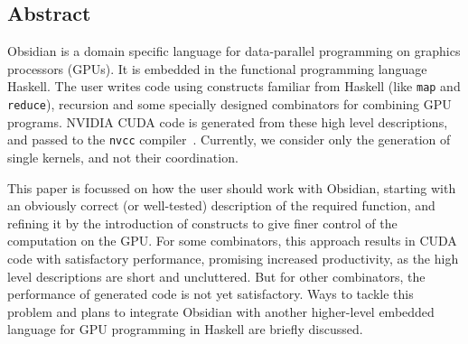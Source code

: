 





\subsection*{Abstract}
Obsidian is a domain specific language for data-parallel programming 
on graphics processors (GPUs). It is embedded in the functional 
programming language Haskell. The user writes code using constructs 
familiar from Haskell (like {\tt map} and {\tt reduce}), recursion 
and some specially designed combinators for combining GPU programs. 
NVIDIA CUDA code is generated from these high level descriptions, and 
passed to the {\tt nvcc} compiler~\cite{CUDAGuide2.0}. Currently, we 
consider only the generation of single kernels, and not their coordination.

This paper is focussed on how the user should work with Obsidian, 
starting with an obviously correct (or well-tested) description of the 
required function, and refining it by the introduction of constructs to 
give finer control of the computation on the GPU. For some combinators, 
this approach results in CUDA code with satisfactory performance, promising 
increased productivity, as the high level descriptions are short and 
uncluttered. But for other combinators, the performance of generated code 
is not yet satisfactory. Ways to tackle this problem and plans to integrate 
Obsidian with another higher-level embedded language for GPU programming in 
Haskell are briefly discussed.






